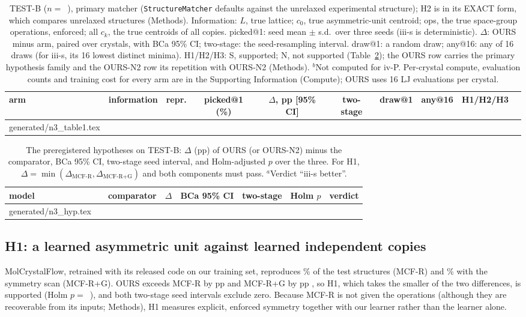 \documentclass[journal=acsodf,manuscript=article]{achemso}
\makeatletter
\newcommand{\inputrows}[1]{\@@input #1 }
\makeatother
\begin{document}
\begin{table}
\caption{TEST-B ($n=$~\nN), primary matcher (\texttt{StructureMatcher} defaults against the
unrelaxed experimental structure); H2 is in its EXACT form, which compares unrelaxed
structures (Methods). Information: $L$, true lattice; $c_0$,
true asymmetric-unit centroid; ops, the true space-group operations, enforced; all $c_k$,
the true centroids of all copies. picked@1: seed mean $\pm$ s.d.\ over three seeds (iii-s
is deterministic). $\Delta$: OURS minus arm, paired over crystals, with BCa 95\% CI;
two-stage: the seed-resampling interval. draw@1: a random draw; any@16: any of 16 draws (for
iii-s, its 16 lowest distinct minima).
H1/H2/H3: S, supported; N, not supported (Table~\ref{tab:hyp}); the OURS row carries the
primary hypothesis family and the OURS-N2 row its repetition with OURS-N2 (Methods). $^{b}$Not computed for iv-P. Per-crystal compute,
evaluation counts and training cost for every arm are in the Supporting Information
(Compute); OURS uses 16 LJ evaluations per crystal.}
\label{tab:main}
\centering
\footnotesize
\setlength{\tabcolsep}{3pt}
\begin{tabular}{llcccccccc}
\toprule
arm & information & repr. & picked@1 (\%) & $\Delta$, pp [95\% CI] & two-stage & draw@1 & any@16 & H1/H2/H3 \\
\midrule
\inputrows{generated/n3_table1.tex}
\bottomrule
\end{tabular}
\end{table}

\begin{table}
\caption{The preregistered hypotheses on TEST-B: $\Delta$ (pp) of OURS (or OURS-N2) minus the
comparator, BCa 95\% CI, two-stage seed interval, and Holm-adjusted $p$ over the three. For
H1, $\Delta=\min(\Delta_{\text{MCF-R}},\Delta_{\text{MCF-R+G}})$ and both components must
pass. $^{a}$Verdict ``iii-s better''.}
\label{tab:hyp}
\centering
\small
\begin{tabular}{lllcccll}
\toprule
model & & comparator & $\Delta$ & BCa 95\% CI & two-stage & Holm $p$ & verdict \\
\midrule
\inputrows{generated/n3_hyp.tex}
\bottomrule
\end{tabular}
\end{table}

\subsection{H1: a learned asymmetric unit against learned independent copies}
MolCrystalFlow, retrained with its released code on our training set, reproduces
\nMcfRPick\% of the test structures (MCF-R) and \nMcfRGPick\% with the symmetry scan
(MCF-R+G). OURS exceeds MCF-R by \nHOneRDelta{} pp \nHOneRCI{} and MCF-R+G by
\nHOneGDelta{} pp \nHOneGCI, so H1, which takes the smaller of the two differences, is
supported (Holm $p=$~\nHOneP), and both two-stage seed intervals exclude zero. Because
MCF-R is not given the operations (although they are recoverable from its inputs;
Methods), H1 measures explicit, enforced symmetry together with our learner rather than the
learner alone.
\end{document}
